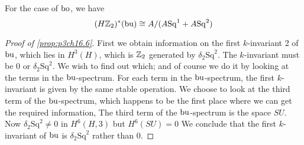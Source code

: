 \documentclass[../main]{subfiles}
\begin{document}
    For the case of $\mathrm{bo}$, we have \[
        (H\mathbb{Z}_2)^{\ast}(\mathrm{bu}) \cong A/(A\mathrm{Sq}^{1}+A\mathrm{Sq}^{2})
    \]
    \begin{proof}[Proof of \ref{prop:p3ch16.6}]
     First we obtain information on the first $k$-invariant
2 of $\mathrm{bu}$, which lies in $H^{3}(H)$, which is $\mathbb{Z}_2$ generated by $
\delta_{2}\mathrm{Sq}^{2}$. The $k$-invariant must be 0 or $\delta_{2}\mathrm{Sq}^{2}$. We wish to find out which; and of course we do it by looking at the terms in the $\mathrm{bu}$-spectrum. For each term in the $\mathrm{bu}$-spectrum, the first $k$-invariant is given by the same stable operation. We choose to look at the third term of the $\mathrm{bu}$-spectrum, which happens to be the first place where we can get the required information, The third term of the $\mathrm{bu}$-spectrum is the space $SU$. Now $\delta_{2}\mathrm{Sq}^{2}\neq 0$ in $H^{6}(H, 3)$ but $H^{6}(SU)=0$ We conclude that the first $k$-invariant of $\mathrm{bu}$ is  $\delta_{2}\mathrm{Sq}^{2}$ rather than 0. 


\end{proof}
\end{document}
